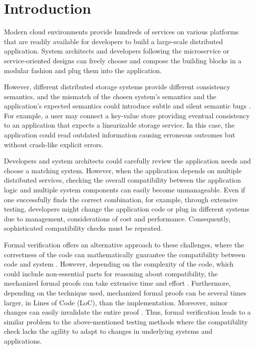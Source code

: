 \section{Introduction}

Modern cloud environments provide hundreds of services on various platforms
that are readily available for developers to build a
large-scale distributed application. System architects and developers
following the microservice or service-oriented designs can freely
choose and compose the building blocks in a modular fashion and plug them
into the application.

However, different distributed storage systems provide different consistency
semantics, and the mismatch of the chosen system's semantics and the
application's expected semantics could introduce subtle and silent
semantic bugs \cite{silentbugs, silentbugs2}. For example, a user may connect a
key-value store providing
eventual consistency to an application that expects a
linearizable storage service. In this case, the application could
read outdated information causing erroneous outcomes but without
crash-like explicit errors.

Developers and system architects could carefully review the
application needs and choose a
matching system. However, when the application depends on multiple
distributed services, checking the overall compatibility between the
application logic and multiple system components can easily become unmanageable. Even
if one successfully finds the correct combination, for example, through
extensive testing, developers might change the application code or
plug in different systems due to management, considerations of cost and performance.
Consequently, sophisticated compatibility checks must be repeated.


Formal verification offers an alternative approach to these challenges,
where the correctness of the code can mathematically guarantee the
compatibility between code and system \cite{lampson2021hints}.
However, depending on
the complexity of the code, which could include non-essential parts
for reasoning about compatibility, the mechanized formal proofs
can take extensive time and effort \cite{certikos-osdi16,
klein2009sel4, wormspace}.
Furthermore, depending on the technique used, mechanized formal
proofs can be several times larger, in Lines of Code (LoC), than the implementation.
Moreover, minor changes can easily invalidate the entire proof
\cite{klein2009sel4}.
Thus, formal verification
leads to a similar problem to the above-mentioned testing methods where
the compatibility check
lacks the agility to adapt to changes in underlying systems and
applications.

